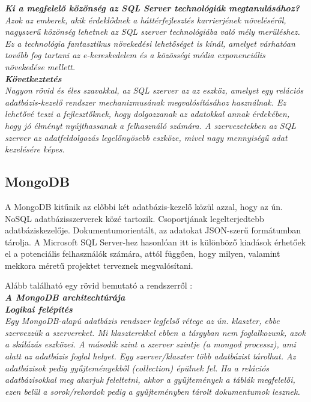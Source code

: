 \noindent\textit{\textbf{Ki a megfelelő közönség az SQL Server technológiák megtanulásához?}}\\

\textit{Azok az emberek, akik érdeklődnek a háttérfejlesztés karrierjének növeléséről, nagyszerű közönség lehetnek az SQL szerver technológiába való mély merüléshez. Ez a technológia fantasztikus növekedési lehetőséget is kínál, amelyet várhatóan tovább fog tartani az e-kereskedelem és a közösségi média exponenciális növekedése mellett.}\\

\noindent\textit{\textbf{Következtetés}}\\

\textit{Nagyon rövid és éles szavakkal, az SQL szerver az az eszköz, amelyet egy relációs adatbázis-kezelő rendszer mechanizmusának megvalósításához használnak. Ez lehetővé teszi a fejlesztőknek, hogy dolgozzanak az adatokkal annak érdekében, hogy jó élményt nyújthassanak a felhasználó számára. A szervezetekben az SQL szerver az adatfeldolgozás legelőnyösebb eszköze, mivel nagy mennyiségű adat kezelésére képes.}


\subsection{MongoDB}

A MongoDB kitűnik az előbbi két adatbázis-kezelő közül azzal, hogy az ún. NoSQL adatbázisszerverek közé tartozik. Csoportjának legelterjedtebb adatbáziskezelője. Dokumentumorientált, az adatokat JSON-szerű formátumban tárolja. 
A Microsoft SQL Server-hez hasonlóan itt is különböző kiadások érhetőek el a potenciális felhasználók számára, attól függően, hogy milyen, valamint mekkora méretű projektet terveznek megvalósítani.

Alább található egy rövid bemutató a rendszerről \cite{mongodbcikk}:\\

\noindent\textit{\textbf{\large{A MongoDB architechtúrája}}}\\

\noindent\textit{\textbf{Logikai felépítés}}\\

\textit{Egy MongoDB-alapú adatbázis rendszer legfelső rétege az ún. klaszter, ebbe szervezzük a szervereket. Mi klaszterekkel ebben a tárgyban nem foglalkozunk, azok a skálázás eszközei. A második szint a szerver szintje (a mongod processz), ami alatt az adatbázis foglal helyet. Egy szerver/klaszter több adatbázist tárolhat. Az adatbázisok pedig gyűjteményekből (collection) épülnek fel. Ha a relációs adatbázisokkal meg akarjuk feleltetni, akkor a gyűjtemények a táblák megfelelői, ezen belül a sorok/rekordok pedig a gyűjteményben tárolt dokumentumok lesznek.}

